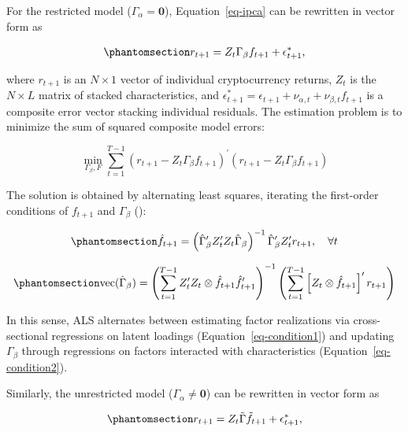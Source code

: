 \documentclass[
  12pt,
  a4paper,
  openany]{scrbook}
\begin{document}
For the restricted model (\(\Gamma_\alpha = \mathbf{0}\)),
Equation~\ref{eq-ipca} can be rewritten in vector form as

\begin{equation}\phantomsection\label{eq-restricted}{
r_{t+1} = Z_t\Gamma_{\beta}f_{t+1} + \epsilon^*_{t+1},
}\end{equation}

where \(r_{t+1}\) is an \(N \times 1\) vector of individual
cryptocurrency returns, \(Z_t\) is the \(N \times L\) matrix of stacked
characteristics, and
\(\epsilon^*_{t+1} = \epsilon_{t+1} + \nu_{\alpha,t} + \nu_{\beta,t}f_{t+1}\)
is a composite error vector stacking individual residuals. The
estimation problem is to minimize the sum of squared composite model
errors:

\[
\min_{\Gamma_\beta, F} \sum_{t=1}^{T-1} 
\left(r_{t+1} - Z_t \Gamma_\beta f_{t+1}\right)^{\prime}
\left(r_{t+1} - Z_t \Gamma_\beta f_{t+1}\right)
\]

The solution is obtained by alternating least squares, iterating the
first-order conditions of \(f_{t+1}\) and \(\Gamma_\beta\)
():

\begin{equation}\phantomsection\label{eq-condition1}{
\hat{f}_{t+1} = \left(\hat{\Gamma}_\beta^{\prime} Z_t^{\prime} Z_t \hat{\Gamma}_\beta \right)^{-1}
\hat{\Gamma}_\beta^{\prime} Z_t^{\prime} r_{t+1}, 
\quad \forall t
}\end{equation}

\begin{equation}\phantomsection\label{eq-condition2}{
\operatorname{vec}(\hat{\Gamma}_\beta) =
\left(
\sum_{t=1}^{T-1} Z_t^{\prime} Z_t \otimes \hat{f}_{t+1} \hat{f}_{t+1}^{\prime}
\right)^{-1}
\left(
\sum_{t=1}^{T-1} \left[ Z_t \otimes \hat{f}_{t+1} \right]^{\prime} r_{t+1}
\right)
}\end{equation}

In this sense, ALS alternates between estimating factor realizations via
cross-sectional regressions on latent loadings
(Equation~\ref{eq-condition1}) and updating \(\Gamma_\beta\) through
regressions on factors interacted with characteristics
(Equation~\ref{eq-condition2}).

Similarly, the unrestricted model (\(\Gamma_\alpha \neq \mathbf{0}\))
can be rewritten in vector form as

\begin{equation}\phantomsection\label{eq-unrestricted}{
r_{t+1} = Z_t\tilde{\Gamma}\tilde{f}_{t+1} + \epsilon^*_{t+1},
}\end{equation}
\end{document}
